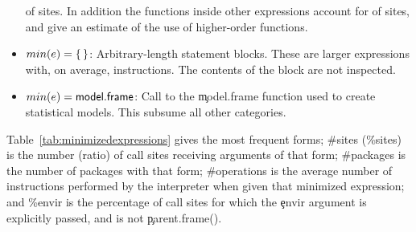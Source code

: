 \documentclass[screen,acmsmall]{acmart}
\begin{document}
\begin{itemize}
  \packageFunctionDefinitionSitesPercent of \eval sites. In addition the
  functions inside other expressions account for
  \packageGeneralizedFunctionDefinitionSitesPercent of sites, and give an
  estimate of the use of higher-order functions.
\item \underline{$min(e)={\sf \{\,\}}$}: Arbitrary-length statement blocks. These
  are larger expressions with, on average, \packageMinimizedoperationsjRnd
  instructions. The contents of the block are not inspected.
\item \underline{$min(e)={\sf model.frame}$}: Call to the \c{model.frame} function
  used to create statistical models. This subsume all other categories.

\end{itemize}

Table~\ref{tab:minimizedexpressions} gives the most frequent forms; \#sites
(\%sites) is the number (ratio) of call sites receiving arguments of that form;
\#packages is the number of packages with that form; \#operations is the average
number of instructions performed by the interpreter when given that minimized
expression; and \%envir is the percentage of call sites for which the \c{envir}
argument is explicitly passed, and is not \c{parent.frame()}.
\end{document}
